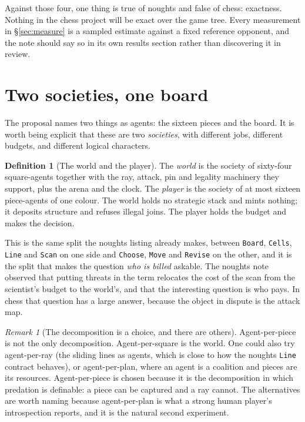 \documentclass[11pt,a4paper]{article}
\theoremstyle{plain}
\theoremstyle{definition}
\newtheorem{definition}[theorem]{Definition}
\theoremstyle{remark}
\newtheorem{remark}[theorem]{Remark}
\begin{document}
Against those four, one thing is true of noughts and false of chess: exactness.
Nothing in the chess project will be exact over the game tree. Every measurement
in \S\ref{sec:measure} is a sampled estimate against a fixed reference opponent,
and the note should say so in its own results section rather than discovering it
in review.

\section{Two societies, one board}
\label{sec:two}

The proposal names two things as agents: the sixteen pieces and the board. It is
worth being explicit that these are two \emph{societies}, with different jobs,
different budgets, and different logical characters.

\begin{definition}[The world and the player]
\label{def:two}
The \emph{world} is the society of sixty-four square-agents together with the
ray, attack, pin and legality machinery they support, plus the arena and the
clock. The \emph{player} is the society of at most sixteen piece-agents of one
colour. The world holds no strategic stack and mints nothing; it deposits
structure and refuses illegal joins. The player holds the budget and makes the
decision.
\end{definition}

This is the same split the noughts listing already makes, between
\texttt{Board}, \texttt{Cells}, \texttt{Line} and \texttt{Scan} on one side
and \texttt{Choose}, \texttt{Move} and \texttt{Revise} on the other, and it is the split
that makes the question \emph{who is billed} askable. The noughts note observed
that putting threats in the term relocates the cost of the scan from the
scientist's budget to the world's, and that the interesting question is who pays.
In chess that question has a large answer, because the object in dispute is the
attack map.

\begin{remark}[The decomposition is a choice, and there are others]
\label{rem:decomp}
Agent-per-piece is not the only decomposition. Agent-per-square is the world.
One could also try agent-per-ray (the sliding lines as agents, which is close to
how the noughts \texttt{Line} contract behaves), or agent-per-plan, where an
agent is a coalition and pieces are its resources. Agent-per-piece is chosen
because it is the decomposition in which predation is definable: a piece can be
captured and a ray cannot. The alternatives are worth naming because
agent-per-plan is what a strong human player's introspection reports, and it is
the natural second experiment.
\end{remark}
\end{document}

